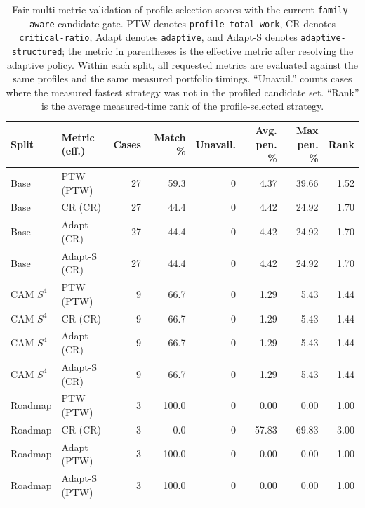 \begin{table}[ht]
\centering
\small
\begin{tabular}{llrrrrrr}
\toprule
Split & Metric (eff.) & Cases & Match \% & Unavail. & Avg. pen. \% & Max pen. \% & Rank \\
\midrule
Base & PTW (PTW) & 27 & 59.3 & 0 & 4.37 & 39.66 & 1.52 \\
Base & CR (CR) & 27 & 44.4 & 0 & 4.42 & 24.92 & 1.70 \\
Base & Adapt (CR) & 27 & 44.4 & 0 & 4.42 & 24.92 & 1.70 \\
Base & Adapt-S (CR) & 27 & 44.4 & 0 & 4.42 & 24.92 & 1.70 \\
\midrule
CAM $S^4$ & PTW (PTW) & 9 & 66.7 & 0 & 1.29 & 5.43 & 1.44 \\
CAM $S^4$ & CR (CR) & 9 & 66.7 & 0 & 1.29 & 5.43 & 1.44 \\
CAM $S^4$ & Adapt (CR) & 9 & 66.7 & 0 & 1.29 & 5.43 & 1.44 \\
CAM $S^4$ & Adapt-S (CR) & 9 & 66.7 & 0 & 1.29 & 5.43 & 1.44 \\
\midrule
Roadmap & PTW (PTW) & 3 & 100.0 & 0 & 0.00 & 0.00 & 1.00 \\
Roadmap & CR (CR) & 3 & 0.0 & 0 & 57.83 & 69.83 & 3.00 \\
Roadmap & Adapt (PTW) & 3 & 100.0 & 0 & 0.00 & 0.00 & 1.00 \\
Roadmap & Adapt-S (PTW) & 3 & 100.0 & 0 & 0.00 & 0.00 & 1.00 \\
\bottomrule
\end{tabular}
\caption{Fair multi-metric validation of profile-selection scores with the current
\texttt{family-aware} candidate gate.  PTW denotes \texttt{profile-total-work}, CR denotes
\texttt{critical-ratio}, Adapt denotes \texttt{adaptive}, and Adapt-S denotes
\texttt{adaptive-structured}; the metric in parentheses is
the effective metric after resolving the adaptive policy.  Within each split, all
requested metrics are evaluated against the same profiles and the same measured portfolio
timings.  ``Unavail.'' counts cases where the measured fastest strategy was not in the
profiled candidate set.  ``Rank'' is the average measured-time rank of the
profile-selected strategy.}
\label{tab:fair-profile-metrics}
\end{table}
